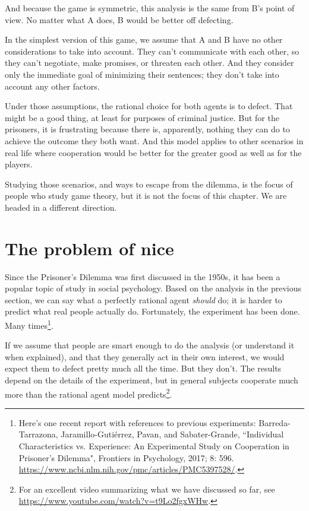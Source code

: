\documentclass[12pt]{book}
\theoremstyle{exercise}
\begin{document}
And because the game is symmetric, this analysis is the same from B's point of view.  No matter what A does, B would be better off defecting.

In the simplest version of this game, we assume that A and B have no other considerations to take into account.  They can't communicate with each other, so they can't negotiate, make promises, or threaten each other.  And they consider only the immediate goal of minimizing their sentences; they don't take into account any other factors.

Under those assumptions, the rational choice for both agents is to defect.  That might be a good thing, at least for purposes of criminal justice.  But for the prisoners, it is frustrating because there is, apparently, nothing they can do to achieve the outcome they both want.  And this model applies to other scenarios in real life where cooperation would be better for the greater good as well as for the players.

Studying those scenarios, and ways to escape from the dilemma, is the focus of people who study game theory, but it is not the focus of this chapter.  We are headed in a different direction.


\section{The problem of nice}

Since the Prisoner's Dilemma was first discussed in the 1950s, it has been a popular topic of study in social psychology.  Based on the analysis in the previous section, we can say what a perfectly rational agent {\em should} do; it is harder to predict what real people actually do.  Fortunately, the experiment has been done.  Many times\footnote{Here's one recent report with references to previous experiments:
Barreda-Tarrazona, Jaramillo-Guti\'{e}rrez, Pavan, and Sabater-Grande,
``Individual Characteristics vs. Experience: An Experimental Study on Cooperation in Prisoner's Dilemma", Frontiers in Psychology, 2017; 8: 596.
\url{https://www.ncbi.nlm.nih.gov/pmc/articles/PMC5397528/}.}.

If we assume that people are smart enough to do the analysis (or understand it when explained), and that they generally act in their own interest, we would expect them to defect pretty much all the time.  But they don't.  The results depend on the details of the experiment, but in general subjects cooperate much more than the rational agent model predicts\footnote{For an excellent video summarizing what we have discussed so far, see \url{https://www.youtube.com/watch?v=t9Lo2fgxWHw}.}.
\end{document}
